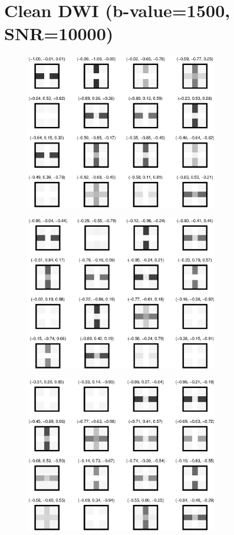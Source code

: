 \documentclass[10pt]{article}
\begin{document}
\section{Clean DWI (b-value=1500, SNR=10000)}
\begin{figure}[H]
  \centering
  \includegraphics[width=0.75\textwidth]{figures/DWI01.eps}
\end{figure}
\begin{figure}[H]
  \centering
  \includegraphics[width=0.75\textwidth]{figures/DWI02.eps}
\end{figure}
\begin{figure}[H]
  \centering
  \includegraphics[width=0.75\textwidth]{figures/DWI03.eps}
\end{figure}
\end{document}
